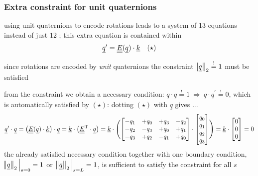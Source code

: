 \begin{frame}
  \frametitle{Extra constraint for unit quaternions}
  
  using unit quaternions to encode rotations leads to a system of 13 equations \newline
  instead of just 12 ; this extra equation is contained within
  \begin{displaymath}
    \underline{q}^{\prime} = \underline{\underline{E}}(\underline{q}) \cdot \underline{k} \quad (\star)
  \end{displaymath}
  
  since rotations are encoded by \textit{unit} quaternions the constraint $\norm[1]{\underline{q}}_{2} \overset{!}{=} 1$ must be satisfied
  
  from the constraint we obtain a necessary condition: $\underline{q} \cdot \underline{q} \overset{!}{=} 1 \: \Rightarrow \: \underline{q} \cdot \underline{q}^{\prime} \overset{!}{=} 0$, which is automatically satisfied by $(\star)$: dotting $(\star)$ with $\underline{q}$ gives ...
  \begin{displaymath}
    \underline{q}^{\prime} \cdot \underline{q} =
    \bigl( \underline{\underline{E}}(\underline{q}) \cdot \underline{k} \bigr) \cdot \underline{q} =
    \underline{k} \cdot \bigl( \underline{\underline{E}}^{\mathrm{T}} \cdot \underline{q} \bigr) =
    \underline{k} \cdot \Biggl(
    \begin{bmatrix}
      -q_1 & +q_0 & +q_3 & -q_2\\
      -q_2 & -q_3 & +q_0 & +q_1\\
      -q_3 & +q_2 & -q_1 & +q_0
    \end{bmatrix} \cdot
    \begin{bmatrix}
      q_0 \\ q_1 \\ q_2 \\ q_3
    \end{bmatrix}
    \Biggr) =
    \underline{k} \cdot
    \begin{bmatrix}
      0 \\ 0 \\ 0
    \end{bmatrix} = 0
  \end{displaymath}
  the already satisfied necessary condition together with one boundary condition, $\norm[1]{\underline{q}}_{2} \sVert[2]_{s=0} = 1$ or $\: \norm[1]{\underline{q}}_{2} \sVert[2]_{s=L} = 1$, is sufficient to satisfy the constraint for all $s$
\end{frame}


